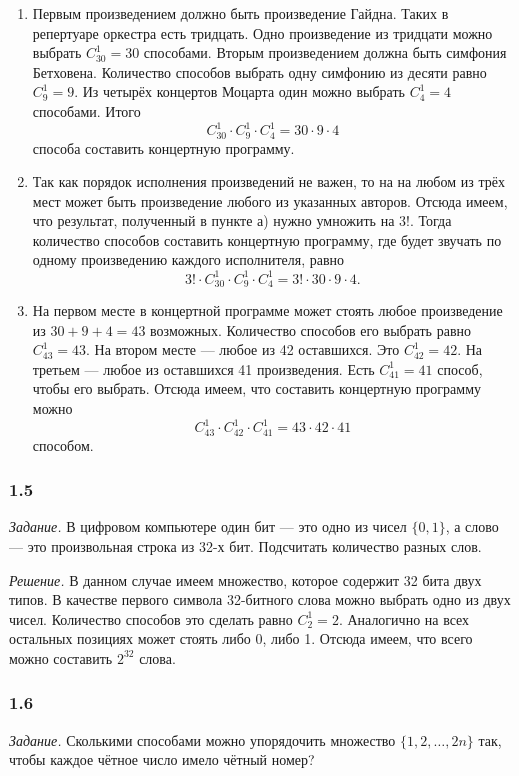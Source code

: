 \begin{enumerate}[label=\alph*)]
\item Первым произведением должно быть произведение Гайдна.
Таких в репертуаре оркестра есть тридцать.
Одно произведение из тридцати можно выбрать $C_{30}^1=30$ способами.
Вторым произведением должна быть симфония Бетховена.
Количество способов выбрать одну симфонию из десяти равно $C_9^1=9$.
Из четырёх концертов Моцарта один можно выбрать $C_4^1=4$ способами.
Итого $$C_{30}^1\cdot C_9^1\cdot C_4^1=30\cdot 9\cdot 4$$ способа составить концертную программу.

\item Так как порядок исполнения произведений не важен, то на на любом из трёх мест может быть произведение любого из указанных авторов.
Отсюда имеем, что результат, полученный в пункте а) нужно умножить на $3!$.
Тогда количество способов составить концертную программу, где будет звучать по одному произведению каждого исполнителя, равно
$$ 3! \cdot C_{30}^1 \cdot C_9^1 \cdot C_4^1 = 3! \cdot 30 \cdot 9 \cdot 4.$$

\item На первом месте в концертной программе может стоять любое произведение из $30+9+4=43$ возможных.
Количество способов его выбрать равно $C_{43}^1=43$.
На втором месте --- любое из 42 оставшихся.
Это $C_{42}^1=42$.
На третьем --- любое из оставшихся 41 произведения.
Есть $C_{41}^1=41$ способ, чтобы его выбрать.
Отсюда имеем, что составить концертную программу можно
$$ C_{43}^1 \cdot C_{42}^1 \cdot C_{41}^1 = 43 \cdot 42 \cdot 41 $$ способом.
\end{enumerate}

\subsubsection*{1.5}

\textit{Задание.} В цифровом компьютере один бит --- это одно из чисел $\{0, 1\}$, а слово --- это произвольная строка из 32-х бит.
Подсчитать количество разных слов.

\textit{Решение.} В данном случае имеем множество, которое содержит 32 бита двух типов.
В качестве первого символа 32-битного слова можно выбрать одно из двух чисел.
Количество способов это сделать равно $C_{2}^1=2$.
Аналогично на всех остальных позициях может стоять либо 0, либо 1.
Отсюда имеем, что всего можно составить $2^{32}$ слова.

\subsubsection*{1.6}
\textit{Задание.} Сколькими способами можно упорядочить множество $\{1, 2,  \dotsc , 2n\}$ так, чтобы каждое чётное число имело чётный номер?

